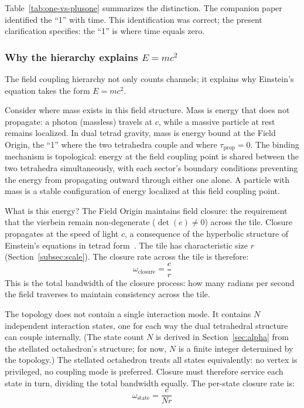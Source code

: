 \documentclass[aps,prd,preprint,superscriptaddress,showpacs,preprintnumbers,amsmath,amssymb,nofootinbib]{revtex4-2}
\begin{document}
Table~\ref{tab:one-vs-plusone} summarizes the distinction. The companion paper~\cite{paper6} identified the ``1'' with time. This identification was correct; the present clarification specifies: the ``1'' is where time equals zero.

\subsubsection*{Why the hierarchy explains $E = mc^2$}

The field coupling hierarchy not only counts channels; it explains why Einstein's equation takes the form $E = mc^2$.

Consider where mass exists in this field structure. Mass is energy that does not propagate: a photon (massless) travels at $c$, while a massive particle at rest remains localized. In dual tetrad gravity, mass is energy bound at the Field Origin, the ``1'' where the two tetrahedra couple and where $\tau_{\text{prop}} = 0$. The binding mechanism is topological: energy at the field coupling point is shared between the two tetrahedra simultaneously, with each sector's boundary conditions preventing the energy from propagating outward through either one alone. A particle with mass is a stable configuration of energy localized at this field coupling point.

What is this energy? The Field Origin maintains field closure: the requirement that the vierbein remain non-degenerate ($\det(e) \neq 0$) across the tile. Closure propagates at the speed of light $c$, a consequence of the hyperbolic structure of Einstein's equations in tetrad form~\cite{buchman2003}. The tile has characteristic size $r$ (Section~\ref{subsec:scale}). The closure rate across the tile is therefore:
\begin{equation}
\omega_{\text{closure}} = \frac{c}{r}
\label{eq:closure-rate-tile}
\end{equation}
This is the total bandwidth of the closure process: how many radians per second the field traverses to maintain consistency across the tile.

The topology does not contain a single interaction mode. It contains $N$ independent interaction states, one for each way the dual tetrahedral structure can couple internally. (The state count $N$ is derived in Section~\ref{sec:alpha} from the stellated octahedron's structure; for now, $N$ is a finite integer determined by the topology.) The stellated octahedron treats all states equivalently: no vertex is privileged, no coupling mode is preferred. Closure must therefore service each state in turn, dividing the total bandwidth equally. The per-state closure rate is:
\begin{equation}
\omega_{\text{state}} = \frac{c}{Nr}
\label{eq:per-state-rate}
\end{equation}
\end{document}
